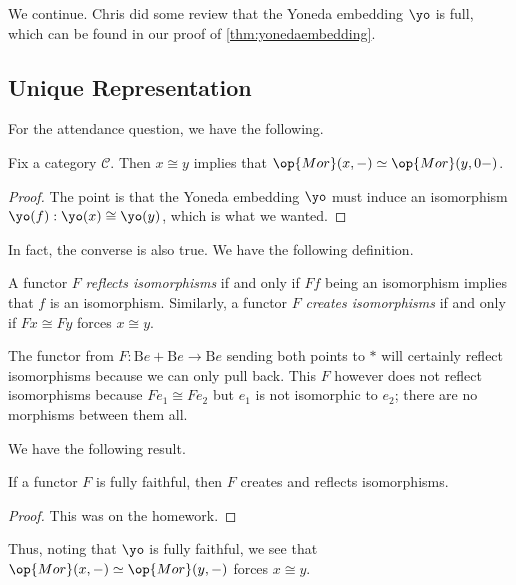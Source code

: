 \documentclass[../notes.tex]{subfiles}
\begin{document}

We continue. Chris did some review that the Yoneda embedding $\yo$ is full, which can be found in our proof of \autoref{thm:yonedaembedding}.

\subsection{Unique Representation}
For the attendance question, we have the following.
\begin{proposition}
	Fix a category $\mathcal C$. Then $x\cong y$ implies that $\op{Mor}(x,-)\simeq\op{Mor}(y,0-)$.
\end{proposition}
\begin{proof}
	The point is that the Yoneda embedding $\yo$ must induce an isomorphism $\yo(f):\yo(x)\cong\yo(y)$, which is what we wanted.
\end{proof}
In fact, the converse is also true. We have the following definition.
\begin{definition}
	A functor $F$ \textit{reflects isomorphisms} if and only if $Ff$ being an isomorphism implies that $f$ is an isomorphism. Similarly, a functor $F$ \textit{creates isomorphisms} if and only if $Fx\cong Fy$ forces $x\cong y$.
\end{definition}
\begin{example}
	The functor from $F:\mathrm Be+\mathrm Be\to\mathrm Be$ sending both points to $*$ will certainly reflect isomorphisms because we can only pull back. This $F$ however does not reflect isomorphisms because $Fe_1\cong Fe_2$ but $e_1$ is not isomorphic to $e_2$; there are no morphisms between them all.
\end{example}
We have the following result.
\begin{proposition}
	If a functor $F$ is fully faithful, then $F$ creates and reflects isomorphisms.
\end{proposition}
\begin{proof}
	This was on the homework.
\end{proof}
\begin{remark}
	Thus, noting that $\yo$ is fully faithful, we see that $\op{Mor}(x,-)\simeq\op{Mor}(y,-)$ forces $x\cong y$.
\end{remark}
\end{document}

